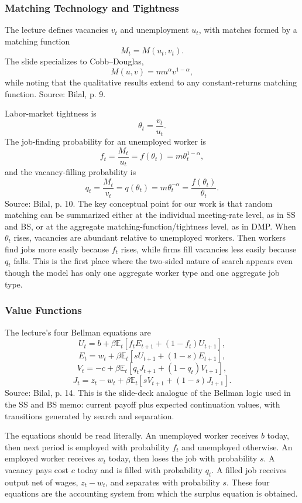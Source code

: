 ﻿\documentclass[11pt]{article}
\newcommand{\E}{\mathbb{E}}
\newcommand{\1}{\mathbf{1}}
\begin{document}
\subsubsection{Matching Technology and Tightness}

The lecture defines vacancies $v_t$ and unemployment $u_t$, with matches formed
by a matching function
\[
M_t=M(u_t,v_t).
\]
The slide specializes to Cobb--Douglas,
\[
M(u,v)=m u^\alpha v^{1-\alpha},
\]
while noting that the qualitative results extend to any constant-returns
matching function. Source: Bilal, p. 9.

Labor-market tightness is
\[
\theta_t=\frac{v_t}{u_t}.
\]
The job-finding probability for an unemployed worker is
\[
f_t=\frac{M_t}{u_t}=f(\theta_t)=m\theta_t^{1-\alpha},
\]
and the vacancy-filling probability is
\[
q_t=\frac{M_t}{v_t}=q(\theta_t)=m\theta_t^{-\alpha}
=\frac{f(\theta_t)}{\theta_t}.
\]
Source: Bilal, p. 10. The key conceptual point for our work is that random
matching can be summarized either at the individual meeting-rate level, as in
SS and BS, or at the aggregate matching-function/tightness level, as in DMP.
When $\theta_t$ rises, vacancies are abundant relative to unemployed workers.
Then workers find jobs more easily because $f_t$ rises, while firms fill
vacancies less easily because $q_t$ falls. This is the first place where the
two-sided nature of search appears even though the model has only one aggregate
worker type and one aggregate job type.

\subsubsection{Value Functions}

The lecture's four Bellman equations are
\[
U_t=b+\beta \E_t\left[f_t E_{t+1}+(1-f_t)U_{t+1}\right],
\]
\[
E_t=w_t+\beta \E_t\left[sU_{t+1}+(1-s)E_{t+1}\right],
\]
\[
V_t=-c+\beta \E_t\left[q_tJ_{t+1}+(1-q_t)V_{t+1}\right],
\]
\[
J_t=z_t-w_t+\beta \E_t\left[sV_{t+1}+(1-s)J_{t+1}\right].
\]
Source: Bilal, p. 14. This is the slide-deck analogue of the Bellman logic used
in the SS and BS memo: current payoff plus expected continuation values, with
transitions generated by search and separation.

The equations should be read literally. An unemployed worker receives $b$ today,
then next period is employed with probability $f_t$ and unemployed otherwise. An
employed worker receives $w_t$ today, then loses the job with probability $s$.
A vacancy pays cost $c$ today and is filled with probability $q_t$. A filled job
receives output net of wages, $z_t-w_t$, and separates with probability $s$.
These four equations are the accounting system from which the surplus equation
is obtained.
\end{document}
